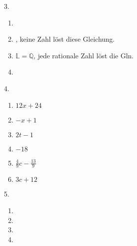 \documentclass[11pt,a4paper]{scrartcl}
\begin{document}
3.\vspace{-2em}%
\begin{multicols}{2}
	\begin{enumerate}[label=\alph*), noitemsep] 
		\item {}
		\item \SOLN{}, keine Zahl löst diese Gleichung.
		\item $\mathbb{L} = \mathbb{Q}$, jede rationale Zahl löst die Gln.
		\item {}
	\end{enumerate}
\end{multicols}

4.\vspace{-2em} %
\begin{multicols}{3}
	\begin{enumerate}[label=\alph*), noitemsep] 
		\item $12x+24$ \item $-x+1$ \item $2t-1$
		\item $-18$ \item $\frac{4}{9}c-\frac{13}{9}$ \item $3c+12$
	\end{enumerate}
\end{multicols}

5.\vspace{-2em}%
\begin{multicols}{4}
	\begin{enumerate}[label=\alph*)] 
		\item {} \item {}
		\item \SOLN{} \item {}
	\end{enumerate}
\end{multicols}
\end{document}
